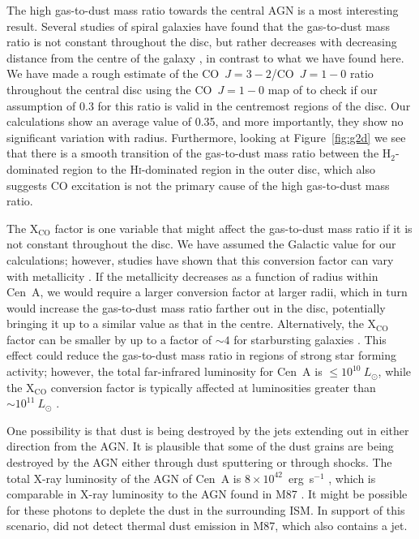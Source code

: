 The high gas-to-dust mass ratio towards the central AGN is a most interesting result.  Several studies of spiral galaxies have found that the gas-to-dust mass ratio is not constant throughout the disc, but rather decreases with decreasing distance from the centre of the galaxy \citep[e.g.][]{2009ApJ...701.1965M,2010MNRAS.402.1409B,2011arXiv1106.0618M}, in contrast to what we have found here.  We have made a rough estimate of the CO~$J=3-2$/CO~$J=1-0$ ratio throughout the central disc using the CO~$J=1-0$ map of \citet{1990ApJ...363..451E} to check if our assumption of 0.3 for this ratio is valid in the centremost regions of the disc.  Our calculations show an average value of 0.35, and more importantly, they show no significant variation with radius.  Furthermore, looking at Figure~\ref{fig:g2d} we see that there is a smooth transition of the gas-to-dust mass ratio between the H$_{2}$-dominated region to the H\textsc{i}-dominated region in the outer disc, which also suggests CO excitation is not the primary cause of the high gas-to-dust mass ratio.

The X$_{\mathrm{CO}}$ factor is one variable that might affect the gas-to-dust mass ratio if it is not constant throughout the disc.  We have assumed the Galactic value for our calculations; however, studies have shown that this conversion factor can vary with metallicity \citep{1995ApJ...448L..97W, 1997A&A...328..471I, 2000mhs..conf..293I, 2000MNRAS.317..649B, 2003A&A...397...87I, 2004A&A...422L..47S, 2005A&A...438..855I, 2011ApJ...737...12L}.  If the metallicity decreases as a function of radius within Cen~A, we would require a larger conversion factor at larger radii, which in turn would increase the gas-to-dust mass ratio farther out in the disc, potentially bringing it up to a similar value as that in the centre.  Alternatively, the X$_{\mathrm{CO}}$ factor can be smaller by up to a factor of $\sim 4$ for starbursting galaxies \citep{1998ApJ...507..615D}.  This effect could reduce the gas-to-dust mass ratio in regions of strong star forming activity; however, the total far-infrared luminosity for Cen~A is $\le 10^{10}~L_{\odot}$, while the X$_{\mathrm{CO}}$ conversion factor is typically affected at luminosities greater than $\sim 10^{11}~L_{\odot}$ \citep[e.g.][]{1993ApJ...414L..13D, 1997ApJ...478..144S}.

One possibility is that dust is being destroyed by the jets extending out in either direction from the AGN.  It is plausible that some of the dust grains are being destroyed by the AGN either through dust sputtering or through shocks.  The total X-ray luminosity of the AGN of Cen~A is $8 \times 10^{42}$~erg~s$^{-1}$ \citep{2011ApJ...733...23R}, which is comparable in X-ray luminosity to the AGN found in M87 \citep{2006A&A...459..353W}.  It might be possible for these photons to deplete the dust in the surrounding ISM.  In support of this scenario, \citet{2010A&A...518L..53B} did not detect thermal dust emission in M87, which also contains a jet.


